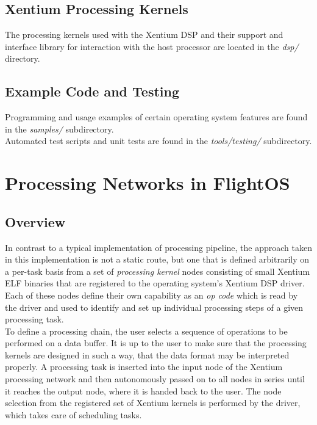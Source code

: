 \section {Xentium Processing Kernels}

The processing kernels used with the Xentium DSP and their support and interface
library for interaction with the host processor are located in the \emph{dsp/}
directory.


\section {Example Code and Testing}

Programming and usage examples of certain operating system features are found in
the \emph{samples/} subdirectory. \\

\noindent
Automated test scripts and unit tests are found in the \emph{tools/testing/}
subdirectory.












\chapter{Processing Networks in FlightOS}

\section{Overview}

In contrast to a typical implementation of processing pipeline, the approach
taken in this implementation is not a static route, but one that is defined
arbitrarily on a per-task basis from a set of \emph{processing kernel} nodes
consisting of small \gls{Xentium} \gls{ELF} binaries that are registered to the
operating system's \gls{Xentium} \gls{DSP} driver. Each of these nodes define
their own capability as an \emph{op code} which is read by the driver and used
to identify and set up individual processing steps of a given processing task.
\\

\noindent
To define a processing chain, the user selects a sequence of operations to be
performed on a data buffer. It is up to the user to make sure that the
processing kernels are designed in such a way, that the data format may be
interpreted properly.
A processing task is inserted into the input node of the Xentium
processing network and then autonomously passed on to all nodes in series until
it reaches the output node, where it is handed back to the user. The node
selection from the registered set of \gls{Xentium} kernels is performed by the
driver, which takes care of scheduling tasks.
\\

